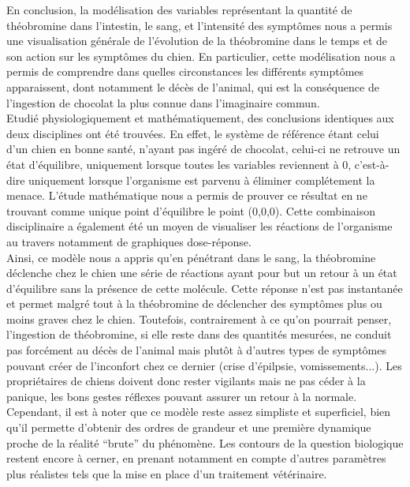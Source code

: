 \documentclass[11pt,a4paper]{article}
\begin{document}
\indent En conclusion, la modélisation des variables représentant la quantité de théobromine dans 
l'intestin, le sang, et l'intensité des symptômes nous a permis une visualisation générale
de l'évolution de la théobromine dans le temps et de son action sur les symptômes du chien.
En particulier, cette modélisation nous a permis de comprendre dans quelles circonstances les
différents symptômes apparaissent, dont notamment le décès de l'animal, qui est la conséquence de 
l'ingestion de chocolat la plus connue dans l'imaginaire commun. \\
\indent Etudié physiologiquement et mathématiquement, des conclusions identiques aux deux disciplines
ont été trouvées. En effet, le système de référence étant celui d'un chien en bonne santé,
n'ayant pas ingéré de chocolat, celui-ci ne retrouve un état d'équilibre, uniquement lorsque
toutes les variables reviennent à 0, c'est-à-dire uniquement lorsque l'organisme est parvenu
à éliminer complétement la menace. L'étude mathématique nous a permis de prouver ce résultat
en ne trouvant comme unique point d'équilibre le point (0,0,0). Cette combinaison disciplinaire
a également été un moyen de visualiser les réactions de l'organisme au travers notamment de
graphiques dose-réponse. \\ 
\indent Ainsi, ce modèle nous a appris qu'en pénétrant dans le sang, la théobromine déclenche chez
le chien une série de réactions ayant pour but un retour à un état d'équilibre sans la 
présence de cette molécule. Cette réponse n'est pas instantanée et permet malgré tout
à la théobromine de déclencher des symptômes plus ou moins graves chez le chien. Toutefois,
contrairement à ce qu'on pourrait penser, l'ingestion de théobromine, si elle reste dans des
quantités mesurées, ne conduit pas forcément au décès de l'animal mais plutôt à d'autres types
de symptômes pouvant créer de l'inconfort chez ce dernier (crise d'épilpsie, vomissements...).
Les propriétaires de chiens doivent donc rester vigilants mais ne pas céder à la panique, les 
bons gestes réflexes pouvant assurer un retour à la normale. \\
\indent Cependant, il est à noter que ce modèle reste assez simpliste et superficiel, bien qu'il permette d'obtenir 
des ordres de grandeur et une première dynamique proche de la réalité “brute” du phénomène. 
Les contours de la question biologique restent encore à cerner, en prenant notamment en 
compte d'autres paramètres plus réalistes tels que la mise en place d'un traitement vétérinaire. 

\end{document}
